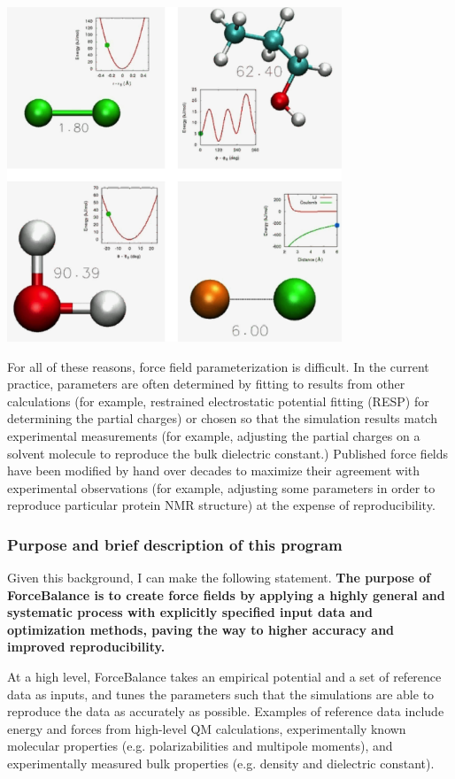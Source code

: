  
\begin{DoxyImage}
\includegraphics[width=10cm]{interactions.png}
\end{DoxyImage}


For all of these reasons, force field parameterization is difficult. In the current practice, parameters are often determined by fitting to results from other calculations (for example, restrained electrostatic potential fitting (R\+E\+SP) for determining the partial charges) or chosen so that the simulation results match experimental measurements (for example, adjusting the partial charges on a solvent molecule to reproduce the bulk dielectric constant.) Published force fields have been modified by hand over decades to maximize their agreement with experimental observations (for example, adjusting some parameters in order to reproduce particular protein N\+MR structure) at the expense of reproducibility.\hypertarget{index_mission_statement}{}\subsubsection{Purpose and brief description of this program}\label{index_mission_statement}
Given this background, I can make the following statement. {\bfseries The purpose of Force\+Balance is to create force fields by applying a highly general and systematic process with explicitly specified input data and optimization methods, paving the way to higher accuracy and improved reproducibility. }

At a high level, Force\+Balance takes an empirical potential and a set of reference data as inputs, and tunes the parameters such that the simulations are able to reproduce the data as accurately as possible. Examples of reference data include energy and forces from high-\/level QM calculations, experimentally known molecular properties (e.\+g. polarizabilities and multipole moments), and experimentally measured bulk properties (e.\+g. density and dielectric constant).

